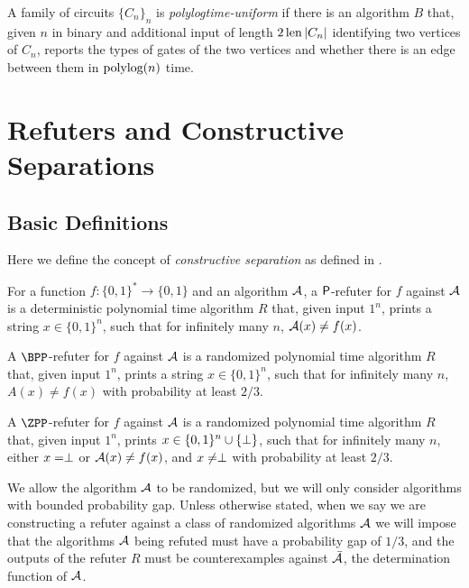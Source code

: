 \begin{definition}
	A family of circuits $\{C_n\}_{n}$ is \emph{polylogtime-uniform} if there is an 
	algorithm $B$ that, given $n$ in binary and additional input of length $2 \operatorname{len} |C_n|$ 
	identifying two vertices of $C_n$, reports the types of gates of the two vertices and whether
	there is an edge between them in $\text{polylog}(n)$ time.  
\end{definition}



\section{Refuters and Constructive Separations}

\subsection{Basic Definitions}

Here we define the concept of \emph{constructive separation} as defined in \cite{ConstructiveSeparations}.

\begin{definition}
	\label{def:refuter}
	For a function $f \colon \{0, 1\}^* \to \{0, 1\}$ and an algorithm $\mathcal{A}$, 
	a $\mathsf{P}$-refuter for $f$ against $\mathcal{A}$ is a deterministic polynomial time
	algorithm $R$ that, given input $1^n$, prints a string $x \in \{0, 1\}^n$,
	such that for infinitely many $n$, $\mathcal{A}(x) \neq f(x)$.
	
	A $\BPP$-refuter for $f$ against $\mathcal{A}$ is a randomized polynomial time algorithm
	$R$ that, given input $1^n$, prints a string $x \in \{0, 1\}^n$, such that 
	for infinitely many $n$, $A(x) \neq f(x)$ with probability at least $2/3$.

	A $\ZPP$-refuter for $f$ against $\mathcal{A}$ is a randomized polynomial time algorithm $R$
	that, given input $1^n$, prints $x \in \{0, 1\}^n \cup \{\perp\}$, such that for 
	infinitely many $n$, either $x = \perp$ or $\mathcal{A}(x) \neq f(x)$, and $x \neq \perp$ with
	probability at least $2/3$. 
\end{definition}

We allow the algorithm $\mathcal{A}$ to be randomized, but we will only consider algorithms with bounded 
probability gap. Unless otherwise stated, when we say we are constructing a refuter against a 
class of randomized algorithms $\mathcal{A}$ we will impose that the algorithms $\mathcal{A}$ being refuted 
must have a probability gap of $1/3$, and the outputs of the refuter $R$ must be counterexamples
against $\bar{\mathcal{A}}$, the determination function of $\mathcal{A}$. 

